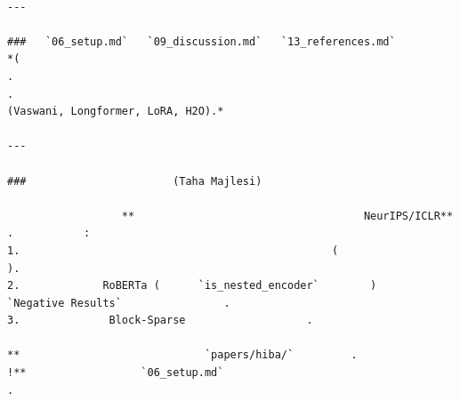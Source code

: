 \begin{lstlisting}

---

###   `06_setup.md`   `09_discussion.md`   `13_references.md`
*(                                                                       .                                                                                                                .                                                                   (Vaswani, Longformer, LoRA, H2O).*

---

###                       (Taha Majlesi)

                  **                                    NeurIPS/ICLR**                   .           :
1.                                                 (                     ).
2.             RoBERTa (      `is_nested_encoder`        )                                    `Negative Results`                .
3.              Block-Sparse                   .

**                             `papers/hiba/`         .                                      !**                  `06_setup.md`                                                                                                  .
\end{lstlisting}